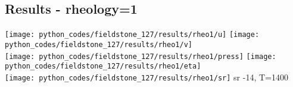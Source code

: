 \newpage
\subsection*{Results - rheology=1}

\begin{center}
\texttt{[image: python\_codes/fieldstone\_127/results/rheo1/u]}
\texttt{[image: python\_codes/fieldstone\_127/results/rheo1/v]}\\
\texttt{[image: python\_codes/fieldstone\_127/results/rheo1/press]}
\texttt{[image: python\_codes/fieldstone\_127/results/rheo1/eta]}\\
\texttt{[image: python\_codes/fieldstone\_127/results/rheo1/sr]}
{\captionfont sr -14, T=1400}
\end{center}



